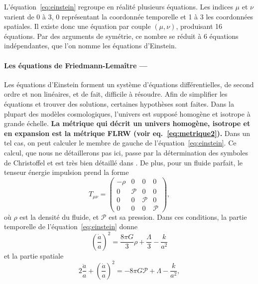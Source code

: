 \documentclass[11pt, twoside, a4paper, openright]{report}
\begin{document}
L'équation~\ref{eq:einstein} regroupe en réalité plusieurs équations. Les indices $\mu$ et $\nu$ varient de 0 à 3, 0 représentant la coordonnée temporelle et 1 à 3 les coordonnées spatiales. Il existe donc une équation par couple $(\mu, \nu)$, produisant 16 équations. Par des arguments de symétrie, ce nombre se réduit à 6 équations indépendantes, que l'on nomme les équations d'Einstein.

\paragraph{Les équations de Friedmann-Lemaître —}
Les équations d'Einstein forment un système d'équations différentielles, de second ordre et non linéaires, et de fait, difficile à résoudre. Afin de simplifier les équations et trouver des solutions, certaines hypothèses sont faites. Dans la plupart des modèles cosmologiques, l'univers est supposé homogène et isotrope à grande échelle.
\textbf{La métrique qui décrit un univers homogène, isotrope et en expansion est la métrique FLRW (voir eq.~\ref{eq:metrique2}).}
Dans un tel cas, on peut calculer le membre de gauche de l'équation~\ref{eq:einstein}. Ce calcul, que nous ne détaillerons pas ici, passe par la détermination des symboles de Christoffel et est très bien détaillé dans \cite{prov: Dodelson 2.1.2}. De plus, pour un fluide parfait, le tenseur énergie impulsion prend la forme
\begin{equation}
  T_{\mu \nu} =
  \begin{pmatrix}
    -\rho & 0 & 0 & 0 \\
    0 & \mathcal{P} & 0 & 0\\
    0 & 0 & \mathcal{P} & 0\\
    0 & 0 & 0 & \mathcal{P}
  \end{pmatrix} ,
\end{equation}
où $\rho$ est la densité du fluide, et $\mathcal{P}$ est sa pression. Dans ces conditions, la partie temporelle de l'équation~\ref{eq:einstein} donne
\begin{equation}
  \label{eq:friedmann1}
  \left(\frac{\dot{a}}{a}\right)^2 = \frac{8 \pi G}{3}\rho + \frac{\Lambda}{3} - \frac{k}{a^2} 
\end{equation}
et la partie spatiale
\begin{equation}
  \label{eq:friedmann2}
  2 \frac{\ddot{a}}{a} + \left(\frac{\dot{a}}{a}\right)^2 = - 8 \pi G \mathcal{P} + \Lambda - \frac{k}{a^2} ,
\end{equation}
\end{document}

